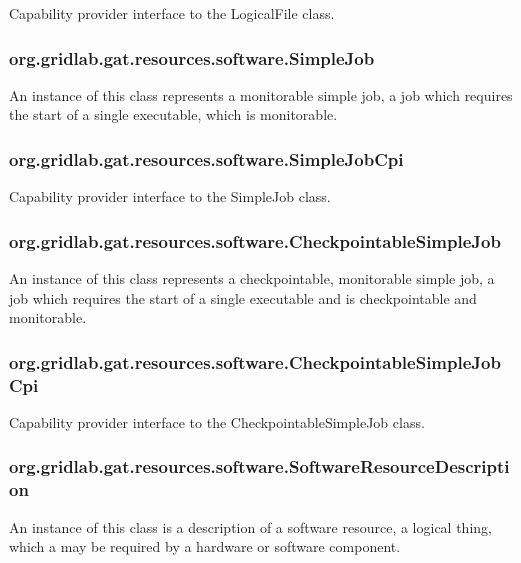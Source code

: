 \documentclass[$Date: 2003/06/26 19:29:31 $]{glabarticle}
\begin{document}
Capability provider interface to the LogicalFile class.

\subsubsection{org.gridlab.gat.resources.software.SimpleJob}

An instance of this class represents a monitorable simple job, a job
which requires the start of a single executable, which is monitorable.

\subsubsection{org.gridlab.gat.resources.software.SimpleJobCpi}

Capability provider interface to the SimpleJob class.

\subsubsection{org.gridlab.gat.resources.software.CheckpointableSimpleJob}

An instance of this class represents a checkpointable, monitorable
simple job, a job which requires the start of a single executable and
is checkpointable and monitorable.

\subsubsection{org.gridlab.gat.resources.software.CheckpointableSimpleJobCpi}

Capability provider interface to the CheckpointableSimpleJob class.

\subsubsection{org.gridlab.gat.resources.software.SoftwareResourceDescription}

An instance of this class is a description of a software resource, a
logical thing, which a may be required by a hardware or software
component.
\end{document}
